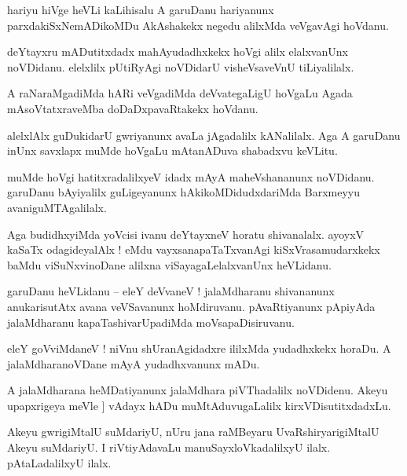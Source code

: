 \documentclass{article}
\begin{document}
\begin{mn}%
hariyu hiVge heVLi kaLihisalu A garuDanu hariyanunx parxdakiSxNemADikoMDu AkAshakekx negedu 
alilxMda veVgavAgi hoVdanu. 
\end{mn}

\begin{mn}%
deYtayxru mADutitxdadx mahAyudadhxkekx hoVgi alilx elalxvanUnx noVDidanu. elelxlilx 
pUtiRyAgi noVDidarU visheVsaveVnU tiLiyalilalx.
\end{mn}

\begin{mn}%
A raNaraMgadiMda hARi veVgadiMda deVvategaLigU hoVgaLu Agada mAsoVtatxraveMba 
doDaDxpavaRtakekx hoVdanu.
\end{mn}

\begin{mn}%
alelxlAlx guDukidarU gwriyanunx avaLa jAgadalilx kANalilalx. Aga A garuDanu inUnx savxlapx 
muMde hoVgaLu mAtanADuva shabadxvu keVLitu.
\end{mn}

\begin{mn}%
muMde hoVgi hatitxradalilxyeV idadx mAyA maheVshananunx noVDidanu. garuDanu bAyiyalilx 
guLigeyanunx hAkikoMDidudxdariMda Barxmeyyu avaniguMTAgalilalx.
\end{mn}

\begin{mn}%
Aga budidhxyiMda yoVcisi ivanu deYtayxneV horatu shivanalalx. ayoyxV kaSaTx odagideyalAlx ! 
eMdu vayxsanapaTaTxvanAgi kiSxVrasamudarxkekx baMdu viSuNxvinoDane alilxna 
viSayagaLelalxvanUnx heVLidanu.
\end{mn}

\begin{mn}%
garuDanu heVLidanu -- eleY deVvaneV ! jalaMdharanu shivananunx anukarisutAtx avana 
veVSavanunx hoMdiruvanu. pAvaRtiyanunx pApiyAda jalaMdharanu kapaTashivarUpadiMda 
moVsapaDisiruvanu.
\end{mn}

\begin{mn}%
eleY goVviMdaneV ! niVnu shUranAgidadxre ililxMda yudadhxkekx horaDu. A jalaMdharanoVDane 
mAyA yudadhxvanunx mADu.
\end{mn}

\begin{mn}%
A jalaMdharana heMDatiyanunx jalaMdhara piVThadalilx noVDidenu. Akeyu upapxrigeya meVle ]
vAdayx hADu muMtAduvugaLalilx kirxVDisutitxdadxLu.
\end{mn}

\begin{mn}%
Akeyu gwrigiMtalU suMdariyU, nUru jana raMBeyaru UvaRshiryarigiMtalU Akeyu suMdariyU. I 
riVtiyAdavaLu manuSayxloVkadalilxyU ilalx. pAtaLadalilxyU ilalx.
\end{mn}
\end{document}

